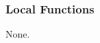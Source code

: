 \documentclass[12pt, titlepage]{article}
\begin{document}
\subsubsection{Local Functions}

None.





\end{document}
